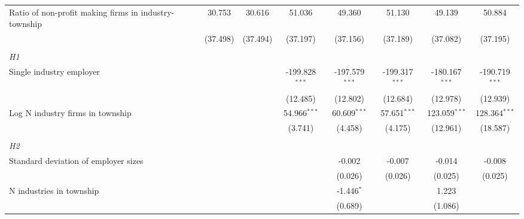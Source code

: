 \begin{tabular}{lcccccccc}
   Ratio of non-profit making firms in industry-township &                 & 30.753          & 30.616          & 51.036           & 49.360           & 51.130           & 49.139           & 50.884\\   
                                                         &                 & (37.498)        & (37.494)        & (37.197)         & (37.156)         & (37.189)         & (37.082)         & (37.195)\\   
\hdashline %
\\[0.1ex] %
\emph{H1} \\ 
   Single industry employer                              &                 &                 &                 & -199.828$^{***}$ & -197.579$^{***}$ & -199.317$^{***}$ & -180.167$^{***}$ & -190.719$^{***}$\\   
                                                         &                 &                 &                 & (12.485)         & (12.802)         & (12.684)         & (12.978)         & (12.939)\\   
   Log N industry firms in township                      &                 &                 &                 & 54.966$^{***}$   & 60.609$^{***}$   & 57.651$^{***}$   & 123.059$^{***}$  & 128.364$^{***}$\\   
                                                         &                 &                 &                 & (3.741)          & (4.458)          & (4.175)          & (12.961)         & (18.587)\\   
\hdashline %
\\[0.1ex] %
\emph{H2} \\ 
   Standard deviation of employer sizes                  &                 &                 &                 &                  & -0.002           & -0.007           & -0.014           & -0.008\\   
                                                         &                 &                 &                 &                  & (0.026)          & (0.026)          & (0.025)          & (0.025)\\   
   N industries in township                              &                 &                 &                 &                  & -1.446$^{*}$     &                  & 1.223            &   \\   
                                                         &                 &                 &                 &                  & (0.689)          &                  & (1.086)          &   \\   

\end{tabular}
